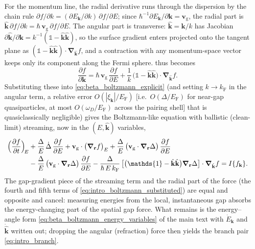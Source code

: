 \documentclass[
  aps,
  prb,
  preprint,
  superscriptaddress,
  longbibliography,
  nofootinbib
]{revtex4-2}
\newcommand{\br}{\mathbf{r}}
\newcommand{\bk}{\mathbf{k}}
\newcommand{\bv}{\mathbf{v}}
\newcommand{\bnabla}{\boldsymbol{\nabla}}
\providecommand{\openone}{}\renewcommand{\openone}{\mathds{1}}
\begin{document}
For the momentum line, the radial derivative runs through the
dispersion by the chain rule \(\partial f/\partial k=(\partial
E_{\bk}/\partial k)\,\partial f/\partial E\); since
\(\hbar^{-1}\partial E_{\bk}/\partial\bk=\bv_{\mathrm{g}}\), the radial part is
\(\hat{\bk}\,\partial f/\partial k=\hbar\,\bv_{\mathrm{g}}\,\partial f/\partial E\).
The angular part is transverse: \(\hat{\bk}=\bk/k\) has Jacobian
\(\partial\hat{\bk}/\partial\bk=k^{-1}(\openone-\hat{\bk}\hat{\bk})\), so
the surface gradient enters projected onto the tangent plane as
\((\openone-\hat{\bk}\hat{\bk})\cdot\bnabla_{\hat{\bk}}f\), and a
contraction with any momentum-space vector keeps only its component
along the Fermi sphere.  thus becomes
\begin{equation}
  \frac{\partial f}{\partial\bk}
  =
  \hbar\,\bv_{\mathrm{g}}\,\frac{\partial f}{\partial E}
  +
  \frac{1}{k}\,
  \bigl(\openone-\hat{\bk}\hat{\bk}\bigr)
  \cdot
  \bnabla_{\hat{\bk}} f .
  \label{eq:intro_p_derivative}
\end{equation}
Substituting these into \cref{eq:beta_boltzmann_explicit} (and
setting \(k\to k_{\mathrm F}\) in the angular term, a relative error
\(O(|\xi_{\bk}|/E_{\mathrm F})\) [i.e.\ \(O(\Delta/E_{\mathrm F})\) for
near-gap quasiparticles, at most \(O(\omega_D/E_{\mathrm F})\) across the
pairing shell] that is quasiclassically negligible) gives the
Boltzmann-like equation with ballistic (clean-limit) streaming, now in
the \((E,\hat{\bk})\) variables,
\begin{equation}
\begin{aligned}
\Bigl(\frac{\partial f}{\partial t}\Bigr)_{\!E}
&+ \frac{\Delta}{E}\,\dot{\Delta}\,\frac{\partial f}{\partial E}
+ \bv_{\mathrm{g}}\cdot\bigl(\bnabla_{\br}f\bigr)_{E}
+ \frac{\Delta}{E}\,\bigl(\bv_{\mathrm{g}}\cdot\bnabla_{\br}\Delta\bigr)\,\frac{\partial f}{\partial E}\\
&- \frac{\Delta}{E}\,\bigl(\bv_{\mathrm{g}}\cdot\bnabla_{\br}\Delta\bigr)\,\frac{\partial f}{\partial E}
- \frac{\Delta}{\hbar\,E\,k_{\mathrm F}}\,
  \bigl[\bigl(\openone-\hat{\bk}\hat{\bk}\bigr)\bnabla_{\br}\Delta\bigr]\cdot\bnabla_{\hat{\bk}}f
= I\{f_{\bk}\}.
\end{aligned}
\label{eq:intro_boltzmann_substituted}
\end{equation}
The gap-gradient piece of the streaming term and the radial part of the
force (the fourth and fifth terms of
\cref{eq:intro_boltzmann_substituted}) are equal and opposite and
cancel: measuring energies from the local, instantaneous gap absorbs the
energy-changing part of the spatial gap force.
What remains is the energy--angle form
\cref{eq:beta_boltzmann_energy_variables} of the main text with
\(\dot E_{\bk}\) and \(\dot{\hat{\bk}}\) written out; dropping the
angular (refraction) force then yields the branch pair
\cref{eq:intro_branch}.



\end{document}
